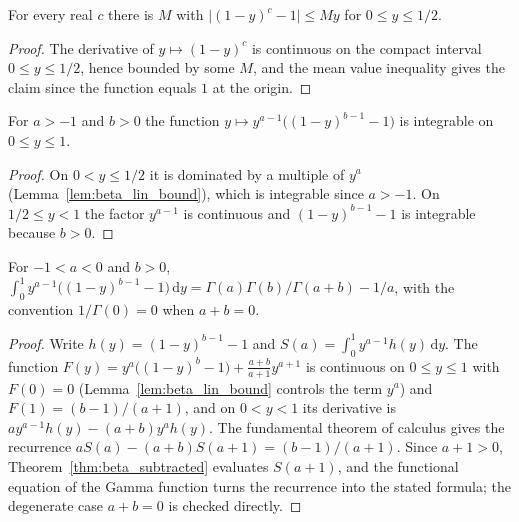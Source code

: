 \begin{lemma}\label{lem:beta_lin_bound}
\leanok
For every real $c$ there is $M$ with $\lvert (1-y)^c - 1\rvert \le M y$ for $0 \le y \le 1/2$.
\end{lemma}

\begin{proof}
\leanok
The derivative of $y \mapsto (1-y)^c$ is continuous on the compact interval $0 \le y \le 1/2$, hence bounded by some $M$, and the mean value inequality gives the claim since the function equals $1$ at the origin.
\end{proof}

\begin{lemma}\label{lem:beta_sub_integrable}
\leanok
For $a > -1$ and $b > 0$ the function $y \mapsto y^{a-1}\bigl((1-y)^{b-1} - 1\bigr)$ is integrable on $0 \le y \le 1$.
\end{lemma}

\begin{proof}
\leanok
On $0 < y \le 1/2$ it is dominated by a multiple of $y^{a}$ (Lemma~\ref{lem:beta_lin_bound}), which is integrable since $a > -1$. On $1/2 \le y < 1$ the factor $y^{a-1}$ is continuous and $(1-y)^{b-1} - 1$ is integrable because $b > 0$.
\end{proof}

\begin{theorem}\label{thm:beta_subtracted_neg}
\leanok
For $-1 < a < 0$ and $b > 0$, $\int_0^1 y^{a-1}\bigl((1-y)^{b-1} - 1\bigr)\, \mathrm{d}y = \Gamma(a)\Gamma(b)/\Gamma(a+b) - 1/a$, with the convention $1/\Gamma(0) = 0$ when $a + b = 0$.
\end{theorem}

\begin{proof}
\leanok
Write $h(y) = (1-y)^{b-1} - 1$ and $S(a) = \int_0^1 y^{a-1} h(y)\, \mathrm{d}y$. The function $F(y) = y^{a}\bigl((1-y)^{b} - 1\bigr) + \frac{a+b}{a+1} y^{a+1}$ is continuous on $0 \le y \le 1$ with $F(0) = 0$ (Lemma~\ref{lem:beta_lin_bound} controls the term $y^a$) and $F(1) = (b-1)/(a+1)$, and on $0 < y < 1$ its derivative is $a y^{a-1} h(y) - (a+b) y^{a} h(y)$. The fundamental theorem of calculus gives the recurrence $a S(a) - (a+b) S(a+1) = (b-1)/(a+1)$. Since $a + 1 > 0$, Theorem~\ref{thm:beta_subtracted} evaluates $S(a+1)$, and the functional equation of the Gamma function turns the recurrence into the stated formula; the degenerate case $a + b = 0$ is checked directly.
\end{proof}
